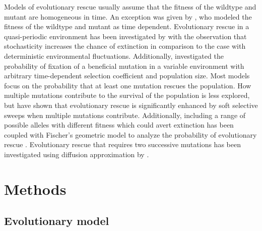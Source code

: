 \documentclass[12pt]{extarticle}
\begin{document}
Models of evolutionary rescue usually assume that the fitness of the wildtype and mutant are homogeneous in time. An exception was given by \citet{marrec2020adapt}, who modeled the fitness of the wildtype and mutant as time dependent. Evolutionary rescue in a quasi-periodic environment has been investigated by \citet{marrec2023evolutionary} with the observation that stochasticity increases the chance of extinction in comparison to the case with deterministic environmental fluctuations. Additionally, \citet{uecker2011fixation} investigated the probability of fixation of a beneficial mutation in a variable environment with arbitrary time-dependent selection coefficient and population size.
Most models focus on the probability that at least one mutation rescues the population. How multiple mutations contribute to the survival of the population is less explored, but \citet{wilson2017soft} have shown that evolutionary rescue is significantly enhanced by soft selective sweeps when multiple mutations contribute. Additionally, including a range of possible alleles with different fitness which could avert extinction has been coupled with Fischer's geometric model to analyze the probability of evolutionary rescue \citep{wahl2023evolutionary,martin2007distributions,osmond2020genetic}.
Evolutionary rescue that requires two successive mutations has been investigated using diffusion approximation by \citet{martin2013probability}.

\section*{Methods}
\subsection*{Evolutionary model}
\end{document}
